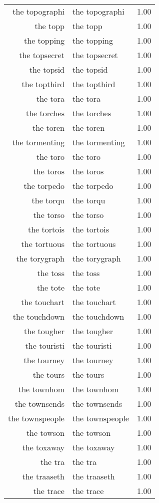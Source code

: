 \begin{table}[ht]
\begin{tabular}{rlr}
  the topographi & the topographi & 1.00 \\ 
  the topp & the topp & 1.00 \\ 
  the topping & the topping & 1.00 \\ 
  the topsecret & the topsecret & 1.00 \\ 
  the topsid & the topsid & 1.00 \\ 
  the topthird & the topthird & 1.00 \\ 
  the tora & the tora & 1.00 \\ 
  the torches & the torches & 1.00 \\ 
  the toren & the toren & 1.00 \\ 
  the tormenting & the tormenting & 1.00 \\ 
  the toro & the toro & 1.00 \\ 
  the toros & the toros & 1.00 \\ 
  the torpedo & the torpedo & 1.00 \\ 
  the torqu & the torqu & 1.00 \\ 
  the torso & the torso & 1.00 \\ 
  the tortois & the tortois & 1.00 \\ 
  the tortuous & the tortuous & 1.00 \\ 
  the torygraph & the torygraph & 1.00 \\ 
  the toss & the toss & 1.00 \\ 
  the tote & the tote & 1.00 \\ 
  the touchart & the touchart & 1.00 \\ 
  the touchdown & the touchdown & 1.00 \\ 
  the tougher & the tougher & 1.00 \\ 
  the touristi & the touristi & 1.00 \\ 
  the tourney & the tourney & 1.00 \\ 
  the tours & the tours & 1.00 \\ 
  the townhom & the townhom & 1.00 \\ 
  the townsends & the townsends & 1.00 \\ 
  the townspeople & the townspeople & 1.00 \\ 
  the towson & the towson & 1.00 \\ 
  the toxaway & the toxaway & 1.00 \\ 
  the tra & the tra & 1.00 \\ 
  the traaseth & the traaseth & 1.00 \\ 
  the trace & the trace & 1.00 \\ 

\end{tabular}
\end{table}
